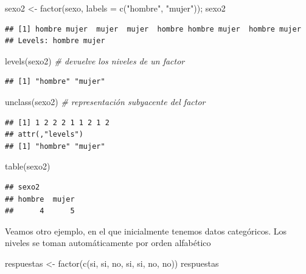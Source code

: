 \documentclass[
]{book}
\newenvironment{Shaded}{\begin{snugshade}}{\end{snugshade}}
\newcommand{\AttributeTok}[1]{\textcolor[rgb]{0.77,0.63,0.00}{#1}}
\newcommand{\CommentTok}[1]{\textcolor[rgb]{0.56,0.35,0.01}{\textit{#1}}}
\newcommand{\FunctionTok}[1]{\textcolor[rgb]{0.00,0.00,0.00}{#1}}
\newcommand{\NormalTok}[1]{#1}
\newcommand{\OtherTok}[1]{\textcolor[rgb]{0.56,0.35,0.01}{#1}}
\newcommand{\StringTok}[1]{\textcolor[rgb]{0.31,0.60,0.02}{#1}}
\theoremstyle{break}
\theoremstyle{nonumberplain}
\begin{document}
\begin{Shaded}
\begin{Highlighting}[]
\NormalTok{sexo2 }\OtherTok{\textless{}{-}} \FunctionTok{factor}\NormalTok{(sexo, }\AttributeTok{labels =} \FunctionTok{c}\NormalTok{(}\StringTok{"hombre"}\NormalTok{, }\StringTok{"mujer"}\NormalTok{)); sexo2}
\end{Highlighting}
\end{Shaded}

\begin{verbatim}
## [1] hombre mujer  mujer  mujer  hombre hombre mujer  hombre mujer 
## Levels: hombre mujer
\end{verbatim}

\begin{Shaded}
\begin{Highlighting}[]
\FunctionTok{levels}\NormalTok{(sexo2)  }\CommentTok{\# devuelve los niveles de un factor}
\end{Highlighting}
\end{Shaded}

\begin{verbatim}
## [1] "hombre" "mujer"
\end{verbatim}

\begin{Shaded}
\begin{Highlighting}[]
\FunctionTok{unclass}\NormalTok{(sexo2)  }\CommentTok{\# representación subyacente del factor}
\end{Highlighting}
\end{Shaded}

\begin{verbatim}
## [1] 1 2 2 2 1 1 2 1 2
## attr(,"levels")
## [1] "hombre" "mujer"
\end{verbatim}

\begin{Shaded}
\begin{Highlighting}[]
\FunctionTok{table}\NormalTok{(sexo2)}
\end{Highlighting}
\end{Shaded}

\begin{verbatim}
## sexo2
## hombre  mujer 
##      4      5
\end{verbatim}

Veamos otro ejemplo, en el que inicialmente tenemos datos categóricos.
Los niveles se toman automáticamente por orden alfabético

\begin{Shaded}
\begin{Highlighting}[]
\NormalTok{respuestas }\OtherTok{\textless{}{-}} \FunctionTok{factor}\NormalTok{(}\FunctionTok{c}\NormalTok{(}\StringTok{\textquotesingle{}si\textquotesingle{}}\NormalTok{, }\StringTok{\textquotesingle{}si\textquotesingle{}}\NormalTok{, }\StringTok{\textquotesingle{}no\textquotesingle{}}\NormalTok{, }\StringTok{\textquotesingle{}si\textquotesingle{}}\NormalTok{, }\StringTok{\textquotesingle{}si\textquotesingle{}}\NormalTok{, }\StringTok{\textquotesingle{}no\textquotesingle{}}\NormalTok{, }\StringTok{\textquotesingle{}no\textquotesingle{}}\NormalTok{))}
\NormalTok{respuestas}
\end{Highlighting}
\end{Shaded}
\end{document}
